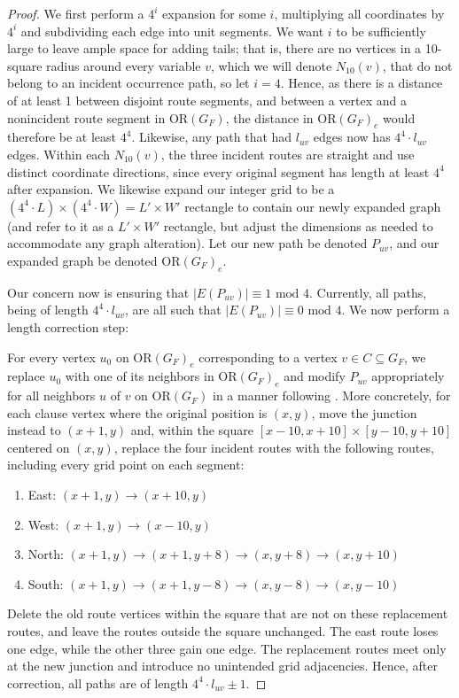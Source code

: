 \documentclass[11pt]{article}
\theoremstyle{plain}
\begin{document}
\begin{proof}
We first perform a $4^{i}$ expansion for some $i$, multiplying all coordinates by $4^{i}$ and subdividing each edge into unit segments. We want $i$ to be sufficiently large to leave ample space for adding tails; that is, there are no vertices in a 10-square radius around every variable $v$, which we will denote $N_{10}(v)$, that do not belong to an incident occurrence path, so let $i=4$. Hence, as there is a distance of at least 1 between disjoint route segments, and between a vertex and a nonincident route segment in $\mathrm{OR}(G_F)$, the distance in $\mathrm{OR}(G_F)_e$ would therefore be at least $4^4$. Likewise, any path that had $l_{uv}$ edges now has $4^4 \cdot l_{uv}$ edges. 
Within each $N_{10}(v)$, the three incident routes are straight and use distinct coordinate directions, since every original segment has length at least $4^4$ after expansion.
We likewise expand our integer grid to be a $(4^4 \cdot L) \times (4^4 \cdot W) = L' \times W'$ rectangle to contain our newly expanded graph (and refer to it as a $L' \times W'$ rectangle, but adjust the dimensions as needed to accommodate any graph alteration). Let our new path be denoted $P_{uv}$, and our expanded graph be denoted $\mathrm{OR}(G_F)_e$.

Our concern now is ensuring that $|E(P_{uv})| \equiv 1 \text{ mod }4$. Currently, all paths, being of length $4^4 \cdot l_{uv}$, are all such that $|E(P_{uv})| \equiv 0 \text{ mod }4$. We now perform a length correction step:

For every vertex $u_0$ on $\mathrm{OR}(G_F)_e$ corresponding to a vertex $v\in C \subseteq G_F$, we replace $u_0$ with one of its neighbors in $\mathrm{OR}(G_F)_e$ and modify $P_{uv}$ appropriately for all neighbors $u$ of $v$ on $\mathrm{OR}(G_F)$ in a manner following \citet[p.~241, Fig.~5]{demange2013matching}. More concretely, for each clause vertex where the original position is $(x,y)$, move the junction instead to $(x+1,y)$ and, within the square $[x-10,x+10]\times [y-10,y+10]$ centered on $(x,y)$, replace the four incident routes with the following routes, including every grid point on each segment:
\begin{enumerate}
    \item East: $(x+1,y) \rightarrow (x+10,y)$
    \item West: $(x+1,y) \rightarrow (x-10,y)$
    \item North: $(x+1,y) \rightarrow (x+1, y+8) \rightarrow (x, y+8) \rightarrow (x, y+10)$
    \item South: $(x+1,y) \rightarrow (x+1, y-8) \rightarrow (x, y-8) \rightarrow (x, y-10)$
\end{enumerate}
Delete the old route vertices within the square that are not on these replacement routes, and leave the routes outside the square unchanged. The east route loses one edge, while the other three gain one edge. The replacement routes meet only at the new junction and introduce no unintended grid adjacencies. Hence, after correction, all paths are of length $4^4 \cdot l_{uv} \pm 1$.


\end{proof}
\end{document}
